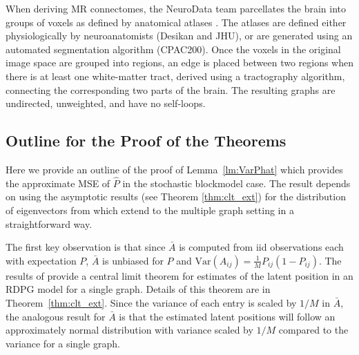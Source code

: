 \documentclass[10pt,letterpaper]{article}
\renewcommand{\hat}{\widehat}
\begin{document}
When deriving MR connectomes, the NeuroData team parcellates the brain into groups of voxels as defined by anatomical atlases \citep{neurodata, kiar2016graph}. The atlases are defined either physiologically by neuroanatomists (Desikan and JHU), or are generated using an automated segmentation algorithm (CPAC200).
Once the voxels in the original image space are grouped into regions, an edge is placed between two regions when there is at least one white-matter tract, derived using a tractography algorithm, connecting the corresponding two parts of the brain.
The resulting graphs are undirected, unweighted, and have no self-loops.


\subsection{Outline for the Proof of the Theorems}
\label{section:outline_proof}
Here we provide an outline of the proof of Lemma~\ref{lm:VarPhat} which provides the approximate MSE of $\hat{P}$ in the stochastic blockmodel case.
The result depends on using the asymptotic results (see Theorem \ref{thm:clt_ext}) for the distribution of eigenvectors from \citet{athreya2013limit} which extend to the multiple graph setting in a straightforward way.

The first key observation is that since $\bar{A}$ is computed from iid observations each with expectation $P$, $\bar{A}$ is unbiased for $P$ and $\mathrm{Var}(A_{ij}) = \frac{1}{M}P_{ij}(1-P_{ij})$.
The results of \citet{athreya2013limit} provide a central limit theorem for estimates of the latent position in an RDPG model for a single graph. Details of this theorem are in Theorem~\ref{thm:clt_ext}.
Since the variance of each entry is scaled by $1/M$ in $\bar{A}$, the analogous result for $\bar{A}$ is that the estimated latent positions will follow an approximately normal distribution with variance scaled by $1/M$ compared to the variance for a single graph. 
    
\end{document}
